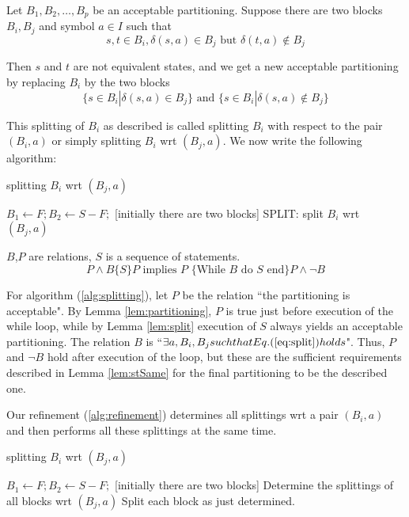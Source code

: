 \begin{lemma} \label{lem:split}
	Let $B_1,B_2,\dots,B_p$ be an acceptable partitioning. Suppose there are two blocks $B_i,B_j$ and symbol $a\in I$ such that
	\begin{equation}
	s,t\in B_i,\delta(s,a)\in B_j \text{ but } \delta(t,a)\notin B_j
	\label{eq:split}
	\end{equation}
	
	Then $s$ and $t$ are not equivalent states, and we get a new acceptable partitioning by replacing $B_i$ by the two blocks
	\begin{equation}
	\{s\in B_i|\delta(s,a)\in B_j\} \text{ and } \{s\in B_i|\delta(s,a)\notin B_j\}
	\end{equation}
\end{lemma}

This splitting of $B_i$ as described is called splitting $B_i$ with respect to the pair $(B_i, a)$ or simply splitting $B_i$ wrt $(B_j, a)$. We now write the following algorithm:

\begin{algorithm}  
	\caption{splitting $B_i$ wrt $(B_j, a)$} 
	\label{alg:splitting} 
	\begin{algorithmic}%
	\State $B_1 \gets F; B_2\gets S-F;$  [initially there are two blocks]  
		\State SPLIT: split $B_i$ wrt $(B_j,a)$
	\EndWhile
	\end{algorithmic}   
\end{algorithm}

$B$,$P$ are relations, $S$ is a sequence of statements.
\begin{equation}
	P\land B\{S\}P \text{ implies $P$ \{While $B$ do $S$ end\} } P\land\lnot B
\end{equation}

For algorithm (\ref{alg:splitting}), let $P$ be the relation ``the partitioning is acceptable". By Lemma \ref{lem:partitioning}, $P$ is true just before execution of the while loop, while by Lemma \ref{lem:split} execution of $S$ always yields an acceptable partitioning. The relation $B$ is ``$\exists a,B_i,B_j such that  Eq. (\ref{eq:split}) holds $". Thus, $P$ and $\lnot B$ hold after execution of the loop, but these are the sufficient requirements described in Lemma \ref{lem:stSame} for the final partitioning to be the described one.

Our refinement (\ref{alg:refinement}) determines all splittings wrt a pair $(B_i, a)$ and then performs all these splittings at the same time.
\begin{algorithm}  
	\caption{splitting $B_i$ wrt $(B_j, a)$} 
	\label{alg:refinement} 
	\begin{algorithmic}%
		\State $B_1 \gets F; B_2\gets S-F;$  [initially there are two blocks]  
		\State Determine the splittings of all blocks wrt $(B_j,a)$
		\State Split each block as just determined.
		\EndWhile
	\end{algorithmic}   
\end{algorithm}

